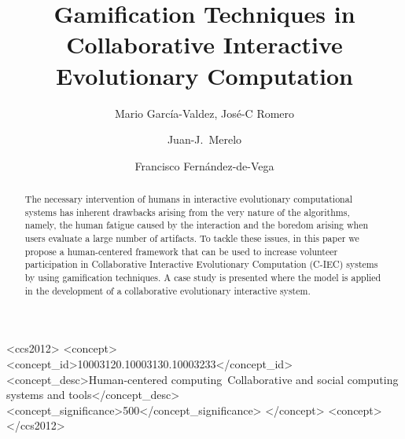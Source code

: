 \documentclass[sigconf]{acmart}
\begin{document}
\title{Gamification Techniques in Collaborative Interactive 
 Evolutionary Computation}

\author{Mario Garc\'ia-Valdez, Jos\'e-C Romero}


\author{Juan-J.~Merelo}

\author{Francisco Fern\'andez-de-Vega}


\begin{abstract} 
The necessary intervention of humans in interactive evolutionary
computational systems has inherent drawbacks arising from the very
nature of the algorithms, namely, the human fatigue caused by the
interaction and the boredom arising when users evaluate a large number
of artifacts. To tackle these issues, in this paper we propose a
human-centered framework that can be used to increase volunteer
participation in Collaborative Interactive Evolutionary Computation
(C-IEC) systems by using gamification techniques. A case study is
presented where the model is applied in the development of a
collaborative evolutionary interactive system.
\end{abstract}

%
%
\begin{CCSXML}
<ccs2012>
<concept>
<concept_id>10003120.10003130.10003233</concept_id>
<concept_desc>Human-centered computing~Collaborative and social computing systems and tools</concept_desc>
<concept_significance>500</concept_significance>
</concept>
<concept>
</ccs2012>
\end{CCSXML}


\maketitle




 
\end{document}
